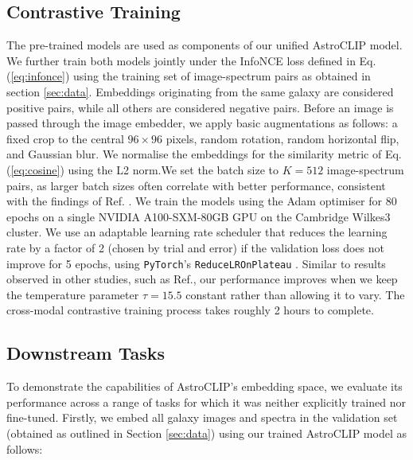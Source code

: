 \documentclass[draft, a4paper,12pt]{article}
\begin{document}
\subsection{Contrastive Training}
\label{sec:training}
The pre-trained models are used as components of our unified AstroCLIP model. We further train both models jointly under the InfoNCE loss defined in Eq. (\ref{eq:infonce}) using the training set of image-spectrum pairs as obtained in section \ref{sec:data}. Embeddings originating from the same galaxy are considered positive pairs, while all others are considered negative pairs. Before an image is passed through the image embedder, we apply basic augmentations as follows: a fixed crop to the central $96 \times 96$ pixels, random rotation, random horizontal flip, and Gaussian blur. We normalise the embeddings for the similarity metric of Eq. (\ref{eq:cosine}) using the L2 norm.We set the batch size to $K=512$ image-spectrum pairs, as larger batch sizes often correlate with better performance, consistent with the findings of Ref. \cite{radford2021learning}. We train the models using the Adam optimiser \cite{adam} for 80 epochs on a single NVIDIA A100-SXM-80GB GPU on the Cambridge Wilkes3 cluster. We use an adaptable learning rate scheduler that reduces the learning rate by a factor of 2 (chosen by trial and error) if the validation loss does not improve for 5 epochs, using \verb|PyTorch|'s \verb|ReduceLROnPlateau| \cite{LRon}. Similar to results observed in other studies, such as Ref.\cite{gir}, our performance improves when we keep the temperature parameter $\tau = 15.5$ constant rather than allowing it to vary. The cross-modal contrastive training process takes roughly 2 hours to complete.

\subsection{Downstream Tasks}
\label{sec:downstream_tasks}
To demonstrate the capabilities of AstroCLIP's embedding space, we evaluate its performance across a range of tasks for which it was neither explicitly trained nor fine-tuned. Firstly, we embed all galaxy images and spectra in the validation set (obtained as outlined in Section \ref{sec:data}) using our trained AstroCLIP model as follows:
\end{document}
